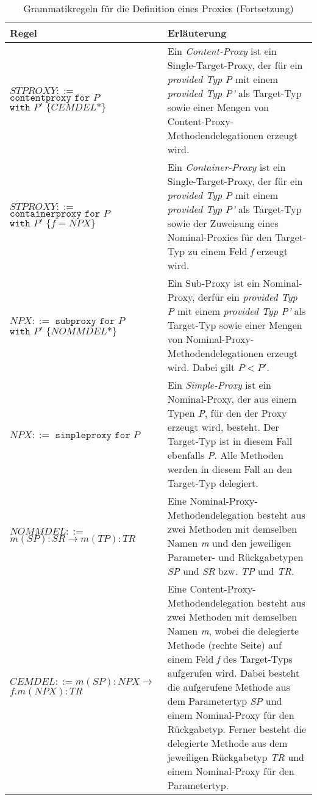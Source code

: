 \documentclass[a4paper,12pt]{article}
\begin{document}
\newpage
\begin{table}[H]
\centering
\begin{tabular}{|p{6cm}|p{8cm}|}
\hline
\centering\textbf{Regel} & \textbf{Erläuterung} \\
\hline
\hline
$\mathit{STPROXY} ::=$\newline $\texttt{contentproxy }  \texttt{for } P$\newline $\texttt{with } P' \texttt{ \{}CEMDEL\text{*}\texttt{\}}$ & Ein \emph{Content-Proxy} ist ein Single-Target-Proxy, der für ein \emph{provided Typ P} mit einem \emph{provided Typ P'} als Target-Typ sowie einer Mengen von Content-Proxy-Methodendelegationen erzeugt wird.\\
\hline
$\mathit{STPROXY} ::=$\newline $\texttt{containerproxy} \texttt{ for } P$\newline
$ \texttt{with } P' \texttt{ \{} f = \mathit{NPX} \texttt{\}}$ &  Ein \emph{Container-Proxy} ist ein Single-Target-Proxy, der für ein \emph{provided Typ P} mit einem \emph{provided Typ P'} als Target-Typ sowie der Zuweisung eines Nominal-Proxies für den Target-Typ zu einem Feld \emph{f} erzeugt wird.\\
\hline
$\mathit{NPX} ::=$ \newline $\texttt{subproxy } \texttt{for } P$\newline $\texttt{with } P' \texttt{ \{}\mathit{NOMMDEL}\text{*\}}$ & Ein Sub-Proxy ist ein Nominal-Proxy, derfür ein \emph{provided Typ P} mit einem \emph{provided Typ P'} als Target-Typ sowie einer Mengen von Nominal-Proxy-Methodendelegationen erzeugt wird. Dabei gilt $P < P'$.\\
\hline
$\mathit{NPX} ::=$ \newline $\texttt{simpleproxy } \texttt{for } P$ & Ein \emph{Simple-Proxy} ist ein Nominal-Proxy, der aus einem Typen \emph{P}, für den der Proxy erzeugt wird, besteht. Der Target-Typ ist in diesem Fall ebenfalls \emph{P}. Alle Methoden werden in diesem Fall an den Target-Typ delegiert.\\
\hline
$\mathit{NOMMDEL} ::=$\newline
$\mathit{m(SP):SR} \rightarrow \mathit{m(TP):TR} $  & Eine Nominal-Proxy-Methodendelegation besteht aus zwei Methoden mit demselben Namen \emph{m} und den jeweiligen Parameter- und Rückgabetypen \emph{SP} und \emph{SR} bzw. \emph{TP} und \emph{TR}. \\
\hline
$\mathit{CEMDEL} ::= \mathit{m(SP):NPX} \rightarrow$\newline
$\mathit{f.m(NPX):TR} $  & Eine Content-Proxy-Methodendelegation besteht aus zwei Methoden mit demselben Namen \emph{m}, wobei die delegierte Methode (rechte Seite) auf einem Feld \emph{f} des Target-Typs aufgerufen wird. Dabei besteht die aufgerufene Methode aus dem Parametertyp \emph{SP} und einem Nominal-Proxy für den Rückgabetyp. Ferner besteht die delegierte Methode aus dem jeweiligen Rückgabetyp \emph{TR} und einem Nominal-Proxy für den Parametertyp.\\
\hline
\hline
\end{tabular}
\caption{Grammatikregeln für die Definition eines Proxies (Fortsetzung)}
 \label{tab:grProxies2}
\end{table}
\end{document}
